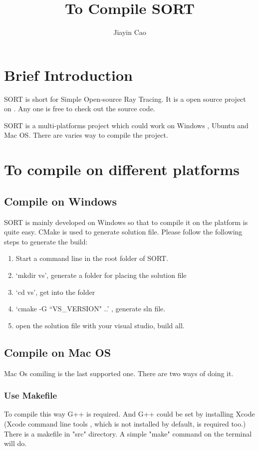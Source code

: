 \documentclass[10pt,a4paper]{article}
\title{ To Compile SORT }
\author{ Jiayin Cao }
\begin{document}
\maketitle

\section{ Brief Introduction }
SORT is short for Simple Open-source Ray Tracing.
It is a open source project on 
\href{http://sourceforge.net/projects/soraytrace/?source=directory}{\color{blue}{sourceforge}}.
Any one is free to check out the source code.

SORT is a multi-platforms project which could work on Windows , Ubuntu and Mac OS.
There are varies way to compile the project.

\section{ To compile on different platforms }
\subsection{ Compile on Windows }
SORT is mainly developed on Windows so that to compile it on the platform is quite easy.
CMake is used to generate solution file. Please follow the following steps to generate the build:
\begin{enumerate}
\item Start a command line in the root folder of SORT.
\item `mkdir vs', generate a folder for placing the solution file
\item `cd vs', get into the folder
\item `cmake -G ``VS\_VERSION" ..'  , generate sln file.
\item open the solution file with your visual studio, build all.
\end{enumerate}

\subsection{ Compile on Mac OS }
Mac Os comiling is the last supported one.
There are two ways of doing it.
\subsubsection{ Use Makefile }
To compile this way G++ is required. And G++ could be set by installing Xcode (Xcode command line tools , which is not installed by default, is required too.)
There is a makefile in "src" directory. 
A simple "make" command on the terminal will do.
\end{document}
